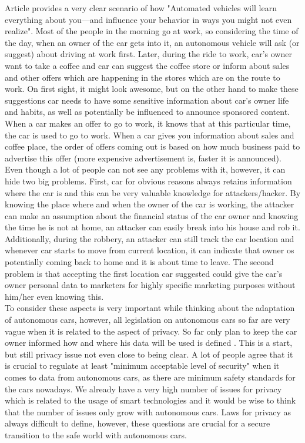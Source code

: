 Article \cite{ThreatenPrivacy} provides a very clear scenario of how "Automated vehicles will learn everything about you—and influence your behavior in ways you might not even realize". Most of the people in the morning go at work, so considering the time of the day, when an owner of the car gets into it, an autonomous vehicle will ask (or suggest) about driving at work first. Later, during the ride to work, car's owner want to take a coffee and car can suggest the coffee store or inform about sales and other offers which are happening in the stores which are on the route to work. On first sight, it might look awesome, but on the other hand to make these suggestions car needs to have some sensitive information about car's owner life and habits, as well as potentially be influenced to announce sponsored content. When a car makes an offer to go to work, it knows that at this particular time, the car is used to go to work. When a car gives you information about sales and coffee place, the order of offers coming out is based on how much business paid to advertise this offer (more expensive advertisement is, faster it is announced). Even though a lot of people can not see any problems with it, however, it can hide two big problems. First, car for obvious reasons always retains information where the car is and this can be very valuable knowledge for attackers/hacker. By knowing the place where and when the owner of the car is working, the attacker can make an assumption about the financial status of the car owner and knowing the time he is not at home, an attacker can easily break into his house and rob it. Additionally, during the robbery, an attacker can still track the car location and whenever car starts to move from current location, it can indicate that owner os potentially coming back to home and it is about time to leave. The second problem is that accepting the first location car suggested could give the car's owner personal data to marketers for highly specific marketing purposes without him/her even knowing this. \\
To consider these aspects is very important while thinking about the adaptation of autonomous cars, however, all legislation on autonomous cars so far are very vague when it is related to the aspect of privacy. So far only plan to keep the car owner informed how and where his data will be used is defined \cite{ThreatenPrivacyII}. This is a start, but still privacy issue not even close to being clear. A lot of people agree that it is crucial to regulate at least "minimum acceptable level of security" when it comes to data from autonomous cars, as there are minimum safety standards for the cars nowadays. We already have a very high number of issues for privacy which is related to the usage of smart technologies and it would be wise to think that the number of issues only grow with autonomous cars. Laws for privacy as always difficult to define, however, these questions are crucial for a secure transition to the safe world with autonomous cars. \\
